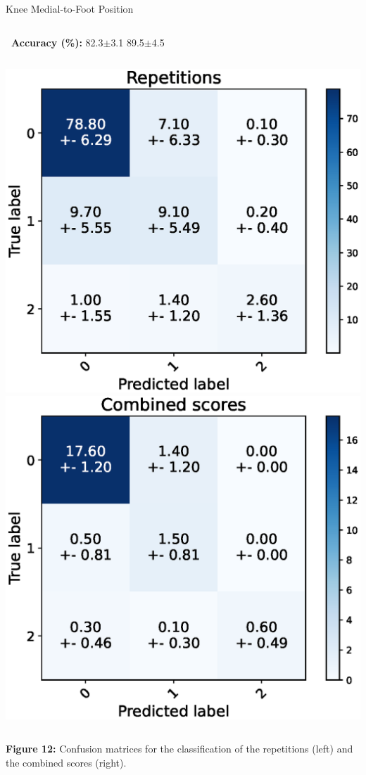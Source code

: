 \begin{frame}[fragile]{Knee Medial-to-Foot Position}
  \begin{columns}
    \textbf{\small~Accuracy (\%):} 82.3$\pm$3.1
    \vspace{0.3cm}
    \centering
    89.5$\pm$4.5
    \vspace{0.3cm}
  \end{columns}
  \begin{columns}
    \centering
    \includegraphics[width=\textwidth]{files/figs/res/kmfp/cnf-reps.eps}
    \centering
    \includegraphics[width=\textwidth]{files/figs/res/kmfp/cnf-combined.eps}
  \end{columns}
  {\scriptsize\newline\textbf{Figure 12:} Confusion matrices for the classification of the repetitions (left) and the combined scores (right).}
\end{frame}

